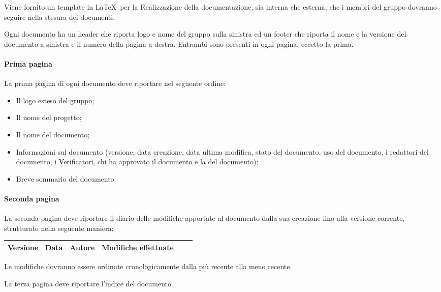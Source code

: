 Viene fornito un template in \LaTeX\ per la Realizzazione della documentazione, sia interna che esterna, che i membri del gruppo dovranno seguire nella stesura dei documenti.

Ogni documento ha un header che riporta logo e nome del gruppo sulla sinistra ed un footer che riporta il nome e la versione del documento a sinistra e il numero della pagina a destra. Entrambi sono presenti in ogni pagina, eccetto la prima.

\paragraph{Prima pagina}
\label{5.2.3}
La prima pagina di ogni documento deve riportare nel seguente ordine:
\begin{itemize}
\item Il logo esteso del gruppo;
\item Il nome del progetto;
\item Il nome del documento;
\item Informazioni sul documento (versione, data creazione, data ultima modifica, stato del documento, uso del documento, i redattori del documento, i Verificatori, chi ha approvato il documento e la  del documento);
\item Breve sommario del documento.
\end{itemize}

\paragraph{Seconda pagina}
\label{5.2.4}
La seconda pagina deve riportare il diario delle modifiche apportate al documento dalla sua creazione fino alla versione corrente, strutturato nella seguente maniera:

\begin{center}
\begin{longtable}{|c|c|c|p{0.5\linewidth}|}
\toprule
\textbf{Versione} & \textbf{Data} & \textbf{Autore} & \textbf{Modifiche effettuate}\\

\bottomrule
\end{longtable}
\end{center}
Le modifiche dovranno essere ordinate cronologicamente dalla più recente alla meno recente.



La terza pagina deve riportare l'indice del documento.



